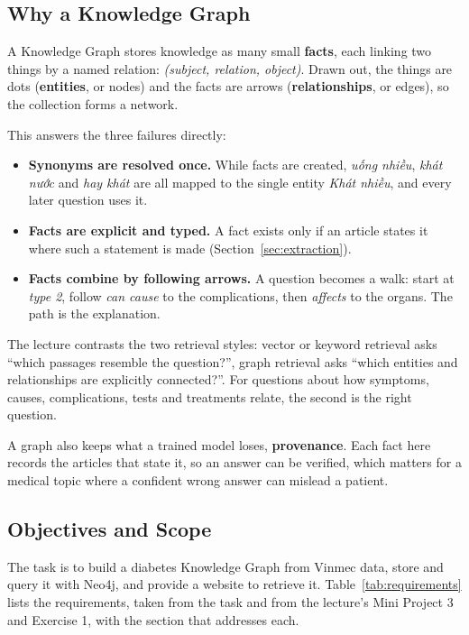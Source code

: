 \documentclass[11pt, a4paper]{article}
\begin{document}
\subsection{Why a Knowledge Graph}

A Knowledge Graph stores knowledge as many small \textbf{facts}, each linking two things by a named relation: \emph{(subject, relation, object)}. Drawn out, the things are dots (\textbf{entities}, or nodes) and the facts are arrows (\textbf{relationships}, or edges), so the collection forms a network.

This answers the three failures directly:
\begin{itemize}
    \item \textbf{Synonyms are resolved once.} While facts are created, \emph{uống nhiều}, \emph{khát nước} and \emph{hay khát} are all mapped to the single entity \emph{Khát nhiều}, and every later question uses it.
    \item \textbf{Facts are explicit and typed.} A fact exists only if an article states it where such a statement is made (Section~\ref{sec:extraction}).
    \item \textbf{Facts combine by following arrows.} A question becomes a walk: start at \emph{type 2}, follow \emph{can cause} to the complications, then \emph{affects} to the organs. The path is the explanation.
\end{itemize}

The lecture contrasts the two retrieval styles: vector or keyword retrieval asks ``which passages resemble the question?'', graph retrieval asks ``which entities and relationships are explicitly connected?''. For questions about how symptoms, causes, complications, tests and treatments relate, the second is the right question.

A graph also keeps what a trained model loses, \textbf{provenance}. Each fact here records the articles that state it, so an answer can be verified, which matters for a medical topic where a confident wrong answer can mislead a patient.

\subsection{Objectives and Scope}

The task is to build a diabetes Knowledge Graph from Vinmec data, store and query it with Neo4j, and provide a website to retrieve it. Table~\ref{tab:requirements} lists the requirements, taken from the task and from the lecture's Mini Project 3 and Exercise 1, with the section that addresses each.
\end{document}
